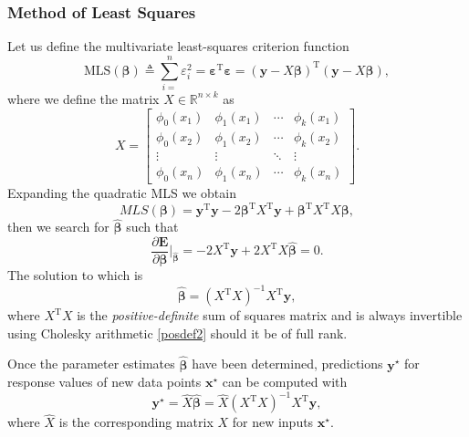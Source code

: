 \documentclass[10pt,a4paper]{article}
\numberwithin{equation}{section}
\theoremstyle{plain}
\theoremstyle{definition}
\theoremstyle{own}
\begin{document}
\subsubsection{Method of Least Squares}
Let us define the multivariate least-squares criterion function
\begin{equation}
\mathrm{MLS}(\boldsymbol\beta) \triangleq \sum_{i=}^n \varepsilon_i^2 = \boldsymbol\varepsilon^{\text{T}}\boldsymbol\varepsilon = (\mathbf{y} - X\boldsymbol\beta)^{\text{T}}(\mathbf{y} - X\boldsymbol\beta),
\end{equation}
where we define the matrix $X \in \mathbb{R}^{n \times k}$ as
\begin{equation}
X = \left[ \begin{matrix}
\phi_0(x_1) & \phi_1(x_1) & \cdots & \phi_k(x_1) \\
\phi_0(x_2) & \phi_1(x_2) & \cdots & \phi_k(x_2) \\
\vdots      & \vdots      & \ddots & \vdots      \\
\phi_0(x_n) & \phi_1(x_n) & \cdots & \phi_k(x_n)
\end{matrix} \right].
\end{equation}
Expanding the quadratic MLS we obtain
\begin{equation}
MLS(\boldsymbol\beta) = \mathbf{y}^{\text{T}}\mathbf{y} - 2\boldsymbol\beta^{\text{T}}X^{\text{T}}\mathbf{y} + \boldsymbol\beta^{\text{T}}X^{\text{T}} X\boldsymbol\beta,
\end{equation}
then we search for $\hat{\boldsymbol\beta}$ such that
\begin{equation}
\frac{\partial \mathbf{E}}{\partial \boldsymbol\beta} \Big|_{\hat{\boldsymbol\beta}} = -2X^{\text{T}}\mathbf{y} + 2 X^{\text{T}} X \hat{\boldsymbol\beta} =  0.
\end{equation}
The solution to which is
\begin{equation}
\boxed{\hat{\boldsymbol\beta} = (X^{\text{T}} X)^{-1} X^{\text{T}}\mathbf{y},}
\end{equation}
where $X^{\text{T}}X$ is the \textit{positive-definite} sum of squares matrix and is always invertible using Cholesky arithmetic \ref{posdef2} should it be of full rank.

Once the parameter estimates $\hat{\boldsymbol\beta}$ have been determined, predictions $\mathbf{y}^\star$ for response values of new data points $\mathbf{x}^{\star}$ can be computed with
\begin{equation}
\mathbf{y}^\star = \hat{X} \hat{\boldsymbol\beta} = \hat{X}(X^{\text{T}} X)^{-1} X^{\text{T}}\mathbf{y},
\end{equation}
where $\hat{X}$ is the corresponding matrix $X$ for new inputs $\mathbf{x}^\star$.
\end{document}
